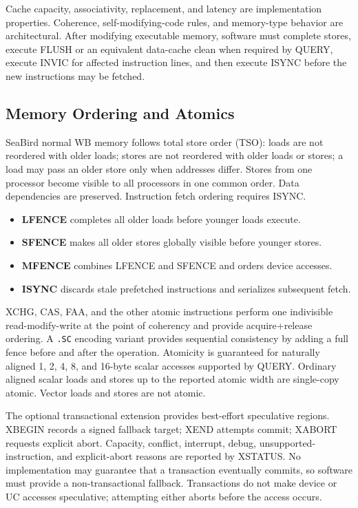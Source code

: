 \documentclass[11pt]{article}
\begin{document}
Cache capacity, associativity, replacement, and latency are implementation properties. Coherence, self-modifying-code rules, and memory-type behavior are architectural. After modifying executable memory, software must complete stores, execute FLUSH or an equivalent data-cache clean when required by QUERY, execute INVIC for affected instruction lines, and then execute ISYNC before the new instructions may be fetched.

\subsection{Memory Ordering and Atomics}

SeaBird normal WB memory follows total store order (TSO): loads are not reordered with older loads; stores are not reordered with older loads or stores; a load may pass an older store only when addresses differ. Stores from one processor become visible to all processors in one common order. Data dependencies are preserved. Instruction fetch ordering requires ISYNC.

\begin{itemize}
    \item \textbf{LFENCE} completes all older loads before younger loads execute.
    \item \textbf{SFENCE} makes all older stores globally visible before younger stores.
    \item \textbf{MFENCE} combines LFENCE and SFENCE and orders device accesses.
    \item \textbf{ISYNC} discards stale prefetched instructions and serializes subsequent fetch.
\end{itemize}

XCHG, CAS, FAA, and the other atomic instructions perform one indivisible read-modify-write at the point of coherency and provide acquire+release ordering. A \texttt{.SC} encoding variant provides sequential consistency by adding a full fence before and after the operation. Atomicity is guaranteed for naturally aligned 1, 2, 4, 8, and 16-byte scalar accesses supported by QUERY. Ordinary aligned scalar loads and stores up to the reported atomic width are single-copy atomic. Vector loads and stores are not atomic.

The optional transactional extension provides best-effort speculative regions. XBEGIN records a signed fallback target; XEND attempts commit; XABORT requests explicit abort. Capacity, conflict, interrupt, debug, unsupported-instruction, and explicit-abort reasons are reported by XSTATUS. No implementation may guarantee that a transaction eventually commits, so software must provide a non-transactional fallback. Transactions do not make device or UC accesses speculative; attempting either aborts before the access occurs.
\end{document}
